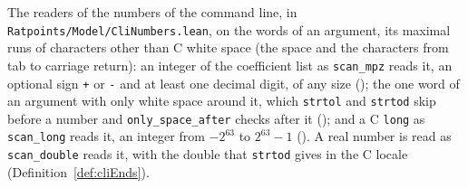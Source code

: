 \begin{definition}\label{def:cliNumbers}
  \leanok
  The readers of the numbers of the command line, in \verb|Ratpoints/Model/CliNumbers.lean|, on the
  words of an argument, its maximal runs of characters other than C white space (the space and the
  characters from tab to carriage return): an integer of the coefficient list as \verb|scan_mpz|
  reads it, an optional sign \verb|+| or \verb|-| and at least one decimal digit, of any size
  (); the one word of an argument with only white space around it, which
  \verb|strtol| and \verb|strtod| skip before a number and \verb|only_space_after| checks after it
  (); and a C \verb|long| as \verb|scan_long| reads it, an integer from
  $-2^{63}$ to $2^{63} - 1$ (). A real number is read as
  \verb|scan_double| reads it, with the double that \verb|strtod| gives in the C locale
  (Definition~\ref{def:cliEnds}).
\end{definition}

